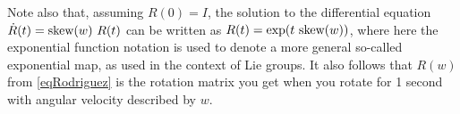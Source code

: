 Note also that, assuming $R(0)=I$, the solution to the differential
equation $\dot R(t) = \text{skew}(w)~ R(t)$ can be written as
$R(t)=\exp(t~ \text{skew}(w))$, where here the exponential function notation
is used to denote a more general so-called exponential map, as used in
the context of Lie groups. It also follows that $R(w)$ from
\eqref{eqRodriguez} is the rotation matrix you get when you rotate for
1 second with angular velocity described by $w$.


